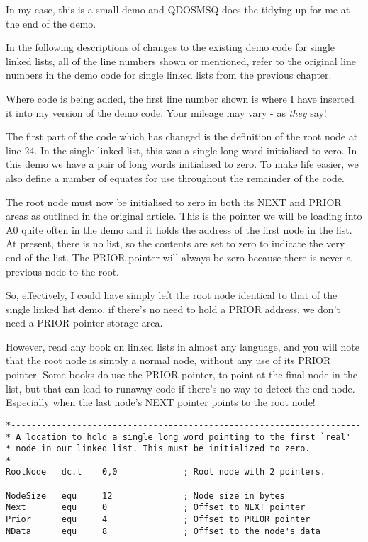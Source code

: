 In my case, this is a small demo and QDOSMSQ does the tidying up for me at the end of the
demo.

\begin{note}
In the following descriptions of changes to the existing demo code for single linked lists, all of the line numbers shown or mentioned, refer to the original line numbers in the demo code for single linked lists from the previous chapter.

Where code is being added, the first line number shown is where I have inserted it into my version of the demo code. Your mileage may vary - as \emph{they} say!
\end{note}

The first part of the code which has changed is the definition of the root node at line 24. In the single linked list, this was a single long word initialised to zero. In this demo we have a pair of long words initialised to zero. To make life easier, we also define a number of equates for use throughout the remainder of the code.

The root node must now be initialised to zero in both its NEXT and PRIOR areas as outlined
in the original article. This is the pointer we will be loading into A0 quite often in
the demo and it holds the address of the first node in the list. At present, there is no
list, so the contents are set to zero to indicate the very end of the list. The PRIOR
pointer will always be zero because there is never a previous node to the root.

\begin{note}
So, effectively, I could have simply left the root node identical to that of the single linked list demo, if there's no need to hold a PRIOR address, we don't need a PRIOR pointer storage area.

However, read any book on linked lists in almost any language, and you will note that the root node is simply a normal node, without any use of its PRIOR pointer. Some books do use the PRIOR pointer, to point at the final node in the list, but that can lead to runaway code if there's no way to detect the end node. Especially when the last node's NEXT pointer points to the root node!
\end{note}

\begin{lstlisting}[firstnumber=24,caption={Doubly Linked List - Demo Code - Root Node}]
*---------------------------------------------------------------------
* A location to hold a single long word pointing to the first `real'
* node in our linked list. This must be initialized to zero.
*---------------------------------------------------------------------
RootNode   dc.l    0,0             ; Root node with 2 pointers.

NodeSize   equ     12              ; Node size in bytes
Next       equ     0               ; Offset to NEXT pointer
Prior      equ     4               ; Offset to PRIOR pointer
NData      equ     8               ; Offset to the node's data
\end{lstlisting}

